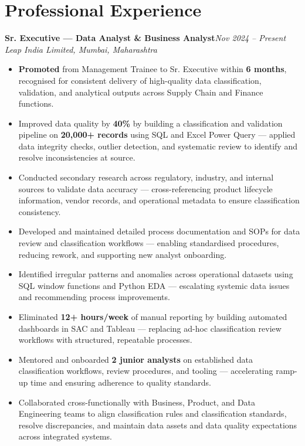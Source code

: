\documentclass[10pt, letterpaper]{article}
\newcommand{\role}[3]{%
  \vspace{2pt}%
  {\bfseries #1}\hfill{\small\color{muted}\textit{#3}}\\[-2pt]%
  {\small\color{muted}\textit{#2}}%
}
\begin{document}
\section{Professional Experience}

\role{Sr. Executive — Data Analyst \& Business Analyst}{Leap India Limited, Mumbai, Maharashtra}{Nov 2024 – Present}

\begin{itemize}
  \item \textbf{Promoted} from Management Trainee to Sr. Executive within \textbf{6 months}, recognised for consistent delivery of high-quality data classification, validation, and analytical outputs across Supply Chain and Finance functions.
  \item Improved data quality by \textbf{40\%} by building a classification and validation pipeline on \textbf{20,000+ records} using SQL and Excel Power Query — applied data integrity checks, outlier detection, and systematic review to identify and resolve inconsistencies at source.
  \item Conducted secondary research across regulatory, industry, and internal sources to validate data accuracy — cross-referencing product lifecycle information, vendor records, and operational metadata to ensure classification consistency.
  \item Developed and maintained detailed process documentation and SOPs for data review and classification workflows — enabling standardised procedures, reducing rework, and supporting new analyst onboarding.
  \item Identified irregular patterns and anomalies across operational datasets using SQL window functions and Python EDA — escalating systemic data issues and recommending process improvements.
  \item Eliminated \textbf{12+ hours/week} of manual reporting by building automated dashboards in SAC and Tableau — replacing ad-hoc classification review workflows with structured, repeatable processes.
  \item Mentored and onboarded \textbf{2 junior analysts} on established data classification workflows, review procedures, and tooling — accelerating ramp-up time and ensuring adherence to quality standards.
  \item Collaborated cross-functionally with Business, Product, and Data Engineering teams to align classification rules and classification standards, resolve discrepancies, and maintain data assets and data quality expectations across integrated systems.
\end{itemize}
\end{document}
